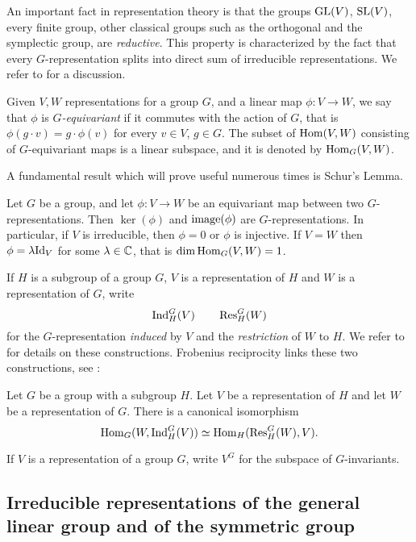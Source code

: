 An important fact in representation theory is that the groups $\mathrm{GL}(V)$, $\mathrm{SL}(V)$, every finite group, other classical groups such as the orthogonal and the symplectic group, are {\it reductive}. This property is characterized by the fact that every $G$-representation splits into direct sum of irreducible representations. We refer to \cite[Ch.9]{FH91} for a discussion. 

\begin{definition}
 \label{introduction-definition-equivariantmap}
Given $V,W$ representations for a group $G$, and a linear map $\phi : V \to W$, we say that $\phi$ is {\it $G$-equivariant} if it commutes with the action of $G$, that is $\phi( g \cdot v) = g \cdot \phi(v)$ for every $v \in V$, $g \in G$. The subset of $\operatorname{Hom}(V,W)$ consisting of $G$-equivariant maps is a linear subspace, and it is denoted by $\operatorname{Hom}_G(V,W)$. 
\end{definition}

A fundamental result which will prove useful numerous times is Schur's Lemma. 
\begin{lemma}
\label{introduction-lemma-Schur}
Let $G$ be a group, and let $\phi : V \to W$ be an equivariant map between two $G$-representations. Then $\ker(\phi)$ and $\mathrm{image}(\phi)$ are $G$-representations. In particular, if $V$ is irreducible, then $\phi = 0$ or $\phi$ is injective. If $V= W$ then $\phi = \lambda \mathrm{Id}_V$ for some $\lambda \in \mathbb{C}$, that is $\dim \operatorname{Hom} _G(V,W) = 1$.
\end{lemma}

If $H$ is a subgroup of a group $G$, $V$ is a representation of $H$ and $W$ is a representation of $G$, write 
\[
\operatorname{Ind}_H^G ( V) \qquad \operatorname{Res}_H^G (W)
\]
for the $G$-representation \emph{induced} by $V$ and the \emph{restriction} of $W$ to $H$. We refer to \cite[Sec. 4.4.1]{GW09} for details on these constructions. Frobenius reciprocity links these two constructions, see \cite[Thm. 4.4.1]{GW09}:
\begin{lemma}
 \label{introduction-lemma-Frobeniusreciprocity}
 Let $G$ be a group with a subgroup $H$. Let $V$ be a representation of $H$ and let $W$ be a representation of $G$. There is a canonical isomorphism
 \[
\operatorname{Hom}_G(W,\operatorname{Ind}_H^G ( V)) \simeq \operatorname{Hom}_H (\operatorname{Res}_H^G (W) , V).
 \]
\end{lemma}
If $V$ is a representation of a group $G$, write $V^G$ for the subspace of $G$-invariants. 

\subsection{Irreducible representations of the general linear group and of the symmetric group}
\label{introduction-subsection-irrepsGLandSn}

